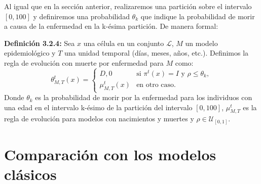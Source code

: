 Al igual que en la sección anterior, realizaremos una partición sobre el intervalo $[0,100]$ y definiremos una probabilidad $\theta_k$ que indique la probabilidad de morir a causa de la enfermedad en la k-ésima partición. De manera formal:

\textbf{Definición 3.2.4:} Sea $x$ una célula en un conjunto $\mathcal{L}$, $M$ un modelo epidemiológico y $T$ una unidad temporal (días, meses, años, etc.). Definimos la regla de evolución con muerte por enfermedad para $M$ como:
\begin{equation}
    \theta_{M,T}^t(x)=\left\{\begin{array}{ll}
        D,0 & \text{si }\pi^t(x)=I\text{ y }\rho\leq\theta_k, \\
        \mu_{M,T}^t(x) & \text{en otro caso.}
    \end{array}\right.
\end{equation}
Donde $\theta_k$ es la probabilidad de morir por la enfermedad para los individuos con una edad en el intervalo k-ésimo de la partición del intervalo $[0,100]$, $\mu_{M,T}^t$ es la regla de evolución para modelos con nacimientos y muertes y $\rho\in\mathcal{U}_{[0,1]}$.
\section{Comparación con los modelos clásicos}